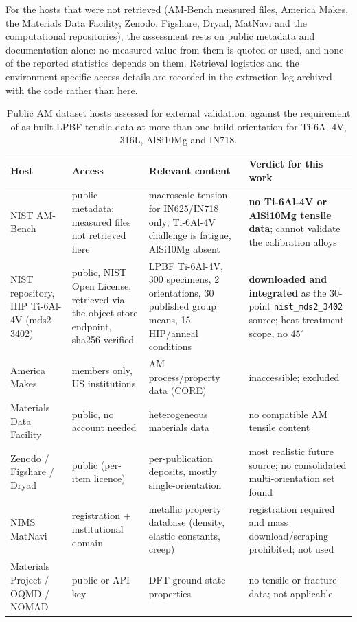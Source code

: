 \documentclass[12pt,a4paper,twocolumn]{article}
\providecommand{\ang}[1]{\ensuremath{#1^{\circ}}}
\begin{document}
For the hosts that were not retrieved (AM-Bench measured files, America Makes, the Materials Data Facility, Zenodo, Figshare, Dryad, MatNavi and the computational repositories), the assessment rests on public metadata and documentation alone: no measured value from them is quoted or used, and none of the reported statistics depends on them. Retrieval logistics and the environment-specific access details are recorded in the extraction log archived with the code rather than here.

\begin{table}[htbp]
\centering
\caption{Public AM dataset hosts assessed for external validation, against the requirement of as-built
LPBF tensile data at more than one build orientation for Ti-6Al-4V, 316L, AlSi10Mg and IN718.}
\label{tab:public_datasets}
\footnotesize
\setlength{\tabcolsep}{4pt}
\begin{tabular}{p{}p{}p{}p{}}
\toprule
\textbf{Host} & \textbf{Access} & \textbf{Relevant content} & \textbf{Verdict for this work} \\
\midrule
NIST AM-Bench & public metadata; measured files not retrieved here & macroscale tension for IN625/IN718 only; Ti-6Al-4V challenge is fatigue, AlSi10Mg absent & \textbf{no Ti-6Al-4V or AlSi10Mg tensile data}; cannot validate the calibration alloys \\
NIST repository, HIP Ti-6Al-4V (mds2-3402) & public, NIST Open License; retrieved via the object-store endpoint, sha256 verified & LPBF Ti-6Al-4V, 300 specimens, 2 orientations, 30 published group means, 15 HIP/anneal conditions & \textbf{downloaded and integrated} as the 30-point \texttt{nist\_mds2\_3402} source; heat-treatment scope, no $\ang{45}$ \\
America Makes & members only, US institutions & AM process/property data (CORE) & inaccessible; excluded \\
Materials Data Facility & public, no account needed & heterogeneous materials data & no compatible AM tensile content \\
Zenodo / Figshare / Dryad & public (per-item licence) & per-publication deposits, mostly single-orientation & most realistic future source; no consolidated multi-orientation set found \\
NIMS MatNavi & registration + institutional domain & metallic property database (density, elastic constants, creep) & registration required and mass download/scraping prohibited; not used \\
Materials Project / OQMD / NOMAD & public or API key & DFT ground-state properties & no tensile or fracture data; not applicable \\
\bottomrule
\end{tabular}
\end{table}
\end{document}
